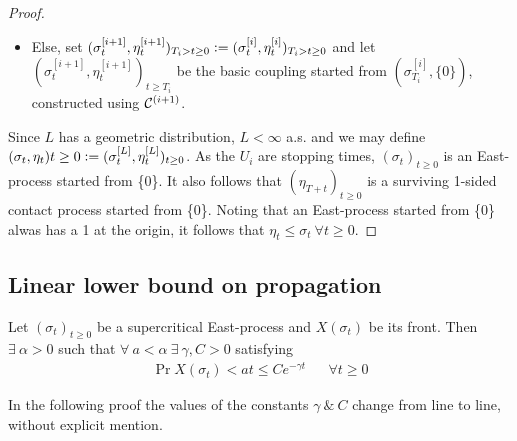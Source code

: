 \begin{proof}
\begin{enumerate}
\begin{itemize}
    \item Else, set $(\sigma^{[i+1]}_t, \eta^{[i+1]}_t)_{T_i > t \geq 0} \defeq (\sigma^{[i]}_t, \eta^{[i]}_t)_{T_i > t \geq 0}$ and let $(\sigma^{[i+1]}_t, \eta^{[i+1]}_t)_{t \geq T_i}$ be the basic coupling started from $(\sigma^{[i]}_{T_i}, \{0\})$, constructed using $\cal{C}^{(i+1)}$. 
  \end{itemize}
\end{enumerate}
Since $L$ has a geometric distribution, $L < \infty$ a.s. and we may define $(\sigma_t, \eta_t){t \geq 0} \defeq (\sigma^{[L]}_t, \eta^{[L]}_t)_{t \geq 0}$. As the $U_i$ are stopping times, $(\sigma_t)_{t \geq 0}$ is an East-process started from \{0\}. It also follows that $(\eta_{T+t})_{t \geq 0}$ is a surviving 1-sided contact process started from \{0\}. Noting that an East-process started from \{0\} alwas has a 1 at the origin, it follows that $\eta_t \leq \sigma_t\ \forall t \geq 0$. 
\end{proof}

\subsection{Linear lower bound on propagation}

\begin{corollary}\label{cor:lower_linear_speed}
Let $(\sigma_t)_{t \geq 0}$ be a supercritical East-process and $X(\sigma_t)$ be its front. Then $\exists\ \alpha > 0$ such that $\forall\ a < \alpha\ \exists\ \gamma, C > 0$ satisfying 
\begin{align}
\Pr{X(\sigma_t) < at} \leq C e^{-\gamma t} && \forall t \geq 0
\end{align}
\end{corollary}

\begin{remark}
In the following proof the values of the constants $\gamma\ \&\ C$ change from line to line, without explicit mention. 
\end{remark}

